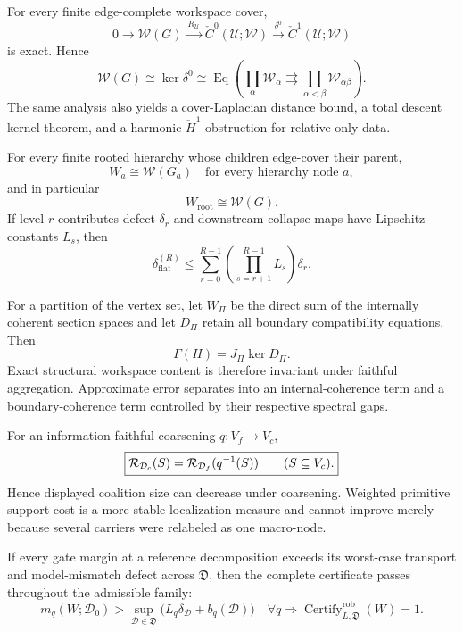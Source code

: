 
For every finite edge-complete workspace cover,
\[
\boxed{
0
\longrightarrow
\mathscr W(G)
\xrightarrow{\ R_{\mathcal U}\ }
\check C^0(\mathcal U;\mathscr W)
\xrightarrow{\ \delta^0\ }
\check C^1(\mathcal U;\mathscr W)
}
\]
is exact. Hence
\[
\boxed{
\mathscr W(G)
\cong
\ker\delta^0
\cong
\operatorname{Eq}
\left(
\prod_\alpha\mathscr W_\alpha
\rightrightarrows
\prod_{\alpha<\beta}\mathscr W_{\alpha\beta}
\right).
}
\]
The same analysis also yields a cover-Laplacian distance bound, a total descent kernel
theorem, and a harmonic \(\check H^1\) obstruction for relative-only data.


For every finite rooted hierarchy whose children edge-cover their parent,
\[
\boxed{
W_a\cong\mathscr W(G_a)
\quad\text{for every hierarchy node }a,
}
\]
and in particular
\[
\boxed{W_{\mathrm{root}}\cong\mathscr W(G).}
\]
If level \(r\) contributes defect \(\delta_r\) and downstream collapse maps
have Lipschitz constants \(L_s\), then
\[
\boxed{
\delta_{\mathrm{flat}}^{(R)}
\leq
\sum_{r=0}^{R-1}
\left(
\prod_{s=r+1}^{R-1}L_s
\right)\delta_r.
}
\]



For a partition of the vertex set, let \(W_\Pi\) be the direct sum of the
internally coherent section spaces and let \(D_\Pi\) retain all boundary
compatibility equations. Then
\[
\boxed{
\Gamma(H)
=
J_\Pi\ker D_\Pi.
}
\]
Exact structural workspace content is therefore invariant under faithful
aggregation. Approximate error separates into an internal-coherence term and
a boundary-coherence term controlled by their respective spectral gaps.


For an information-faithful coarsening \(q:V_f\to V_c\),
\[
\boxed{
\mathcal R_{\mathcal D_c}(S)
=
\mathcal R_{\mathcal D_f}(q^{-1}(S))
\qquad(S\subseteq V_c).
}
\]
Hence displayed coalition size can decrease under coarsening. Weighted
primitive support cost is a more stable localization measure and cannot
improve merely because several carriers were relabeled as one macro-node.


If every gate margin at a reference decomposition exceeds its worst-case
transport and model-mismatch defect across \(\mathfrak D\), then the complete
certificate passes throughout the admissible family:
\[
\boxed{
 m_q(W;\mathcal D_0)
>
\sup_{\mathcal D\in\mathfrak D}
\bigl(L_q\delta_{\mathcal D}+b_q(\mathcal D)\bigr)
\quad\forall q
\Longrightarrow
\operatorname{Certify}_{L,\mathfrak D}^{\mathrm{rob}}(W)=1.
}
\]

